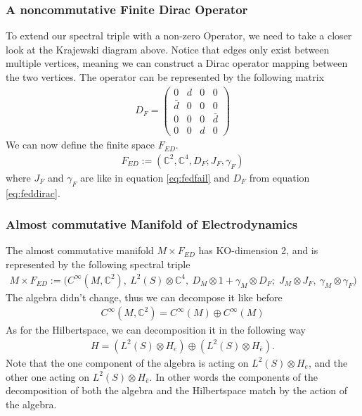\subsubsection{A noncommutative Finite Dirac Operator}
To extend our spectral triple with a non-zero Operator, we need to take a
closer look at the Krajewski diagram above. Notice that edges only exist
between multiple vertices, meaning we can construct a Dirac operator mapping
between the two vertices. The operator can be represented by the following matrix
\begin{align}\label{eq:feddirac}
    D_F =
    \begin{pmatrix}
    0 & d & 0 & 0 \\
    \bar{d} & 0 & 0 & 0 \\
    0 & 0 & 0 & \bar{d} \\
    0 & 0 & d & 0
    \end{pmatrix}
\end{align}
We can now define the finite space $F_{ED}$.
\begin{align}
    F_{ED} := (\mathbb{C}^2, \mathbb{C}^4, D_F; J_F, \gamma_F)
\end{align}
where $J_F$ and $\gamma_F$ are like in equation \eqref{eq:fedfail} and $D_F$
from equation \eqref{eq:feddirac}.

\subsubsection{Almost commutative Manifold of Electrodynamics}
The almost commutative manifold $M\times F_{ED}$ has KO-dimension 2, and is
represented by the following spectral triple
\begin{align}\label{eq:almost commutative manifold}
    M\times F_{ED} := \big(C^\infty(M,\mathbb{C}^2),\ L^2(S)\otimes
    \mathbb{C}^4,\
    D_M\otimes 1 +\gamma _M \otimes D_F;\; J_M\otimes J_F,\ \gamma_M\otimes
    \gamma _F\big)
\end{align}
The algebra didn't change, thus we can decompose it like before
\begin{align}
    C^\infty(M, \mathbb{C}^2) = C^\infty (M) \oplus C^\infty (M)
\end{align}
As for the Hilbertspace, we can decomposition it in the following way
\begin{align}
    H = (L^2(S) \otimes H_e ) \oplus (L^2(S) \otimes H_{\bar{e}}).
\end{align}
Note that the one component of the algebra is acting on $L^2(S) \otimes H_e$,
and the other one acting on $L^2(S) \otimes H_{\bar{e}}$. In other words the components of
the decomposition of both the algebra and the Hilbertspace match by the action of
the algebra.

